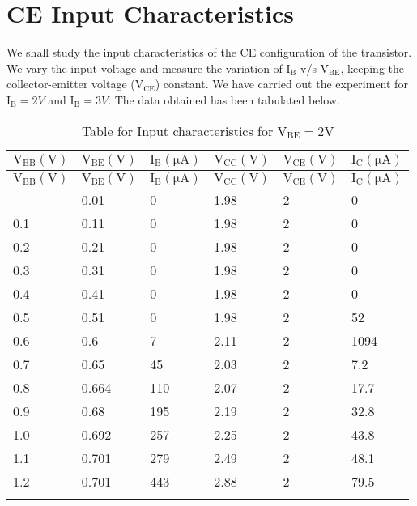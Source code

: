 \documentclass[12pt]{article}
\begin{document}
\section{CE Input Characteristics}
We shall study the input characteristics of the CE configuration of the transistor. We vary the input voltage and measure the variation of  $\mathrm{I_B}$ v/s $\mathrm{V_{BE}}$, keeping the collector-emitter voltage ($\mathrm{V_{CE}}$) constant. We have carried out the experiment for $\mathrm{I_B}=2 V$ and $\mathrm{I_B}=3 V$. The data obtained has been tabulated below.
\begin{longtable}{|l|l|l|l|l|l|}
	\hline
    $\mathrm{V_{BB}(V)}$ & $\mathrm{V_{BE}(V)}$ & $\mathrm{I_{B}(\mu A)}$  & $\mathrm{V_{CC}(V)}$  & $\mathrm{V_{CE}(V)}$ & $\mathrm{I_{C}(\mu A)}$  \\ \hline
	\endfirsthead
	\hline
   $\mathrm{V_{BB}(V)}$ & $\mathrm{V_{BE}(V)}$ & $\mathrm{I_{B}(\mu A)}$  & $\mathrm{V_{CC}(V)}$  & $\mathrm{V_{CE}(V)}$ & $\mathrm{I_{C}(\mu A)}$  \\ \hline
	\endhead
	\hline
	\endfoot
	
	\endlastfoot
    0.01 & 0.01  & 0   & 1.98  & 2  & 0   \\ \hline
    0.1  & 0.11  & 0   & 1.98  & 2  & 0   \\ \hline
    0.2  & 0.21  & 0   & 1.98  & 2  & 0   \\ \hline
    0.3  & 0.31  & 0   & 1.98  & 2  & 0   \\ \hline
    0.4  & 0.41  & 0   & 1.98  & 2  & 0   \\ \hline
    0.5  & 0.51  & 0   & 1.98  & 2  & 52  \\ \hline
    0.6  & 0.6   & 7   & 2.11  & 2  & 1094  \\ \hline
    0.7  & 0.65  & 45  & 2.03  & 2  & 7.2  \\ \hline
    0.8  & 0.664 & 110 & 2.07  & 2  & 17.7  \\ \hline
    0.9  & 0.68  & 195 & 2.19  & 2  & 32.8  \\ \hline
    1.0  & 0.692 & 257 & 2.25  & 2  & 43.8  \\ \hline
    1.1  & 0.701 & 279 & 2.49  & 2  & 48.1  \\ \hline
    1.2  & 0.701   & 443 & 2.88  & 2  & 79.5  \\ \hline
\caption{Table for Input characteristics for $\mathrm{V_{BE}=2V}$}
\label{tab:part01_01}
\end{longtable}
\end{document}
